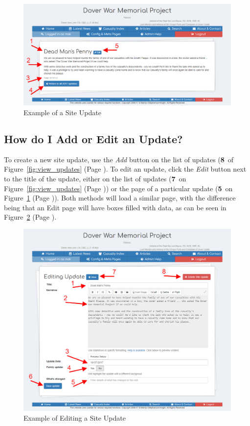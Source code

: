 \documentclass[12pt]{article}
\newcommand{\marker}[1]{\color{red}\textbf{#1}\color{black}}
\newcommand{\myref}[1]{\ref{#1} {\scriptsize(Page \pageref{#1})}}
\begin{document}
\begin{figure}[h]
  \centering
 \includegraphics[width=.9\textwidth]{pics/view_update.png}
	\caption{Example of a Site Update}\label{fig:view_update}
\end{figure}

\newpage
\FloatBarrier
\subsection{How do I Add or Edit an Update?}\label{ssec:edit_update}
To create a new site update, use the \textit{Add} button on the list of updates (\marker{8}\ of Figure~\myref{fig:view_updates}. To edit an update, click the \textit{Edit} button next to the title of the update, either on the list of updates (\marker{7}\ on Figure~\myref{fig:view_updates}) or the page of a particular update (\marker{5}\ on Figure~\myref{fig:view_update}). Both methods will load a similar page, with the difference being that an Edit page will have boxes filled with data, as can be seen in Figure~\myref{fig:edit_update}.

\begin{figure}[h]
  \centering
 \includegraphics[width=.9\textwidth]{pics/edit_update.png}
	\caption{Example of Editing a Site Update}\label{fig:edit_update}
\end{figure}
\end{document}
